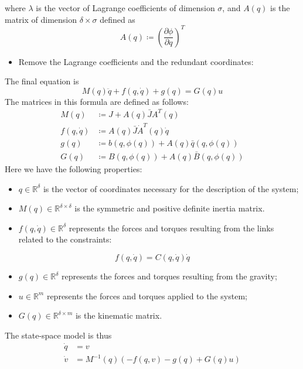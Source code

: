 \documentclass[12pt, openany]{report}
\theoremstyle{definition}
\newcommand{\R}{\mathbb{R}}
\begin{document}
where $\lambda$ is the vector of Lagrange coefficients of dimension $\sigma$, and $A(q)$ is the matrix of dimension $\delta\times \sigma$ defined as 
\begin{equation}
    A(q) \coloneqq \left(\frac{\partial \phi}{\partial q}\right)^T
\end{equation}
\begin{itemize}
    \item Remove the Lagrange coefficients and the redundant coordinates:
\end{itemize}
The final equation is 
\begin{equation}
    M(q)\ddot q + f(q,\dot q) + g(q) = G(q)u
\end{equation}
The matrices in this formula are defined as follows:
\begin{align}
    M(q) &\coloneqq J+A(q)\bar JA^T(q)\\
    f(q,\dot q) &\coloneqq A(q)\bar J\dot A^T(q)\dot q\\
    g(q)&\coloneqq b(q,\phi(q))+A(q)\bar q(q,\phi(q))\\
    G(q)&\coloneqq B(q,\phi(q))+A(q)\bar B(q,\phi(q))
\end{align}
Here we have the following properties:
\begin{itemize}
    \item $q\in \R^\delta$ is the vector of coordinates necessary for the description of the system;
    \item $M(q)\in \R^{\delta \times \delta}$ is the symmetric and positive definite inertia matrix.
    \item $f(q,\dot q)\in \R^\delta$ represents the forces and torques resulting from the links related to the constraints:
\end{itemize}
\begin{equation}
    f(q,\dot q)=C(q,\dot q)\dot q
\end{equation}
\begin{itemize}
    \item $g(q)\in \R^\delta$ represents the forces and torques resulting from the gravity;
    \item $u\in \R^m$ represents the forces and torques applied to the system;
    \item $G(q)\in \R^{\delta \times m}$ is the kinematic matrix. 
\end{itemize}
The state-space model is thus
\begin{align}
    \dot q&=v\nonumber \\
    \dot v&=M^{-1}(q)\left(-f(q,v)-g(q)+G(q)u\right)
\end{align}
\end{document}
